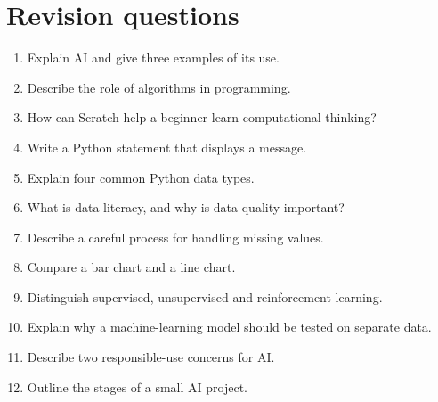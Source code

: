 \documentclass[11pt,openany,oneside]{book}
\begin{document}
\section{Revision questions}
\begin{enumerate}
\item Explain AI and give three examples of its use.
\item Describe the role of algorithms in programming.
\item How can Scratch help a beginner learn computational thinking?
\item Write a Python statement that displays a message.
\item Explain four common Python data types.
\item What is data literacy, and why is data quality important?
\item Describe a careful process for handling missing values.
\item Compare a bar chart and a line chart.
\item Distinguish supervised, unsupervised and reinforcement learning.
\item Explain why a machine-learning model should be tested on separate data.
\item Describe two responsible-use concerns for AI.
\item Outline the stages of a small AI project.
\end{enumerate}
\end{document}
